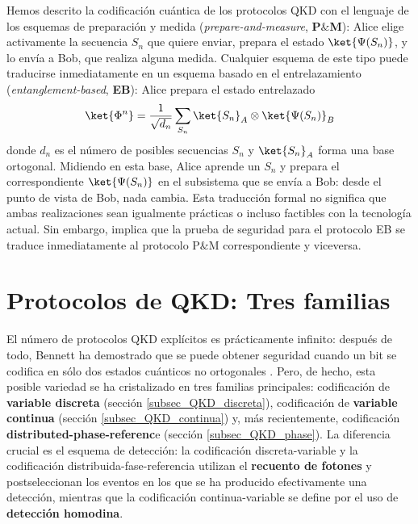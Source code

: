 \documentclass[a4paper,11pt]{book} %
\numberwithin{equation}{chapter}
\begin{document}
Hemos descrito la codificación cuántica de los protocolos QKD con el lenguaje de los esquemas de preparación y medida (\textit{prepare-and-measure}, \textbf{P$\&$M}): Alice elige activamente la secuencia $S_n$ que quiere enviar, prepara el estado $\ket{\Psi(S_n)}$, y lo envía a Bob, que realiza alguna medida. Cualquier esquema de este tipo puede traducirse inmediatamente en un esquema basado en el entrelazamiento (\textit{entanglement-based}, \textbf{EB}): Alice prepara el estado entrelazado
	\begin{equation}
	\ket{\Phi^n} = \frac{1}{\sqrt{d_n}} \sum_{S_n} \ket{S_n}_A \otimes \ket{\Psi(S_n)}_B
	\end{equation}
donde $d_n$ es el número de posibles secuencias $S_n$ y $\ket{S_n}_A$ forma una base ortogonal. Midiendo en esta base, Alice aprende un $S_n$ y prepara el correspondiente $\ket{\Psi(S_n)}$ en el subsistema que se envía a Bob: desde el punto de vista de Bob, nada cambia. Esta traducción formal no significa que ambas realizaciones sean igualmente prácticas o incluso factibles con la tecnología actual. Sin embargo, implica que la prueba de seguridad para el protocolo EB se traduce inmediatamente al protocolo P$\&$M correspondiente y viceversa.
		
	\section{Protocolos de QKD: Tres familias}
	
El número de protocolos QKD explícitos es prácticamente infinito: después de todo, Bennett ha demostrado que se puede obtener seguridad cuando un bit se codifica en sólo dos estados cuánticos no ortogonales \cite{bib_BB84_E91_iguales}. Pero, de hecho, esta posible variedad se ha cristalizado en tres familias principales: codificación de \textbf{variable discreta} (sección \ref{subsec_QKD_discreta}), codificación de \textbf{variable continua} (sección \ref{subsec_QKD_continua}) y, más recientemente, codificación \textbf{distributed-phase-referenc}e (sección \ref{subsec_QKD_phase}). La diferencia crucial es el esquema de detección: la codificación discreta-variable y la codificación distribuida-fase-referencia utilizan el \textbf{recuento de fotones} y postseleccionan los eventos en los que se ha producido efectivamente una detección, mientras que la codificación continua-variable se define por el uso de \textbf{detección homodina}.
\end{document}
